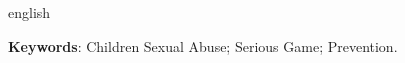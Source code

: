 \begin{resumo}[Abstract]
\begin{otherlanguage*}{english}
   
  \textbf{Keywords}: Children Sexual Abuse; Serious Game; Prevention. 
 \end{otherlanguage*}
\end{resumo}
